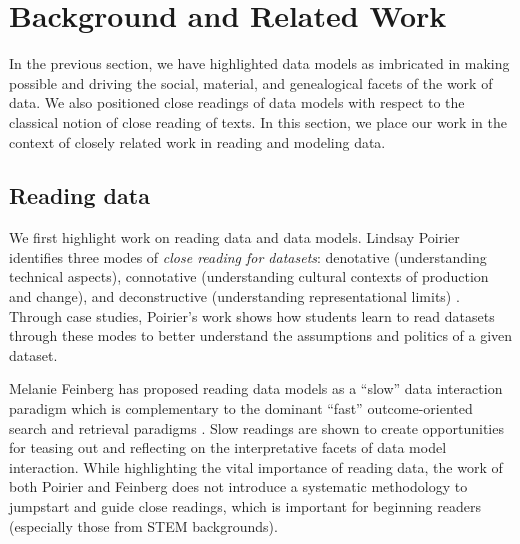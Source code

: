 \section{Background and Related Work}
\label{sec:background}

In the previous section, we have highlighted data models as imbricated in making possible and driving the social, material, and genealogical facets of the work of data.  We also positioned close readings of data models with respect to the classical notion of close reading of texts.  In this section, we place our work in the context of closely related work in reading and modeling data.

\subsection{Reading data}

We first highlight work on reading data and data models.
Lindsay Poirier identifies three modes of \emph{close reading for datasets}: denotative (understanding technical aspects), connotative (understanding cultural contexts of production and change), and deconstructive (understanding representational limits) \cite{poirier}.
Through case studies, Poirier's work shows how students learn to read datasets through these modes to better understand the assumptions and politics of a given dataset.  

Melanie Feinberg has proposed reading data models as a ``slow'' data interaction paradigm which is complementary to the dominant ``fast'' outcome-oriented search and retrieval paradigms \cite{melanieSlow}.   Slow readings are shown to create opportunities for teasing out and reflecting on the interpretative facets of data model interaction.
While highlighting the vital importance of reading data, the work of both Poirier and Feinberg does not introduce a systematic methodology to jumpstart and guide close readings, which is important for beginning readers (especially those from STEM backgrounds). 

